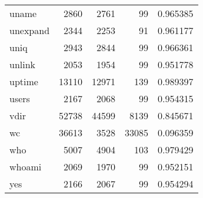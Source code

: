 \begin{tabular}{lrrrr}
uname     &                     2860 &         2761 &            99 &                 0.965385 \\
unexpand  &                     2344 &         2253 &            91 &                 0.961177 \\
uniq      &                     2943 &         2844 &            99 &                 0.966361 \\
unlink    &                     2053 &         1954 &            99 &                 0.951778 \\
uptime    &                    13110 &        12971 &           139 &                 0.989397 \\
users     &                     2167 &         2068 &            99 &                 0.954315 \\
vdir      &                    52738 &        44599 &          8139 &                 0.845671 \\
wc        &                    36613 &         3528 &         33085 &                 0.096359 \\
who       &                     5007 &         4904 &           103 &                 0.979429 \\
whoami    &                     2069 &         1970 &            99 &                 0.952151 \\
yes       &                     2166 &         2067 &            99 &                 0.954294 \\
\bottomrule
\end{tabular}
